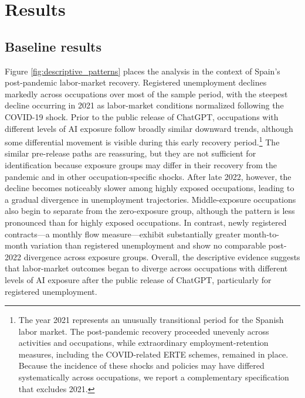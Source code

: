 \documentclass[11pt]{article}
\begin{document}
\section{Results}
\label{sec:results}

\subsection{Baseline results}

Figure \ref{fig:descriptive_patterns} places the analysis in the context of Spain's post-pandemic labor-market recovery. Registered unemployment declines markedly across occupations over most of the sample period, with the steepest decline occurring in 2021 as labor-market conditions normalized following the COVID-19 shock. Prior to the public release of ChatGPT, occupations with different levels of AI exposure follow broadly similar downward trends, although some differential movement is visible during this early recovery period.\footnote{The year 2021 represents an unusually transitional period for the Spanish labor market. The post-pandemic recovery proceeded unevenly across activities and occupations, while extraordinary employment-retention measures, including the COVID-related ERTE schemes, remained in place. Because the incidence of these shocks and policies may have differed systematically across occupations, we report a complementary specification that excludes 2021.} The similar pre-release paths are reassuring, but they are not sufficient for identification because exposure groups may differ in their recovery from the pandemic and in other occupation-specific shocks. After late 2022, however, the decline becomes noticeably slower among highly exposed occupations, leading to a gradual divergence in unemployment trajectories. Middle-exposure occupations also begin to separate from the zero-exposure group, although the pattern is less pronounced than for highly exposed occupations. In contrast, newly registered contracts---a monthly flow measure---exhibit substantially greater month-to-month variation than registered unemployment and show no comparable post-2022 divergence across exposure groups. Overall, the descriptive evidence suggests that labor-market outcomes began to diverge across occupations with different levels of AI exposure after the public release of ChatGPT, particularly for registered unemployment.
\end{document}
